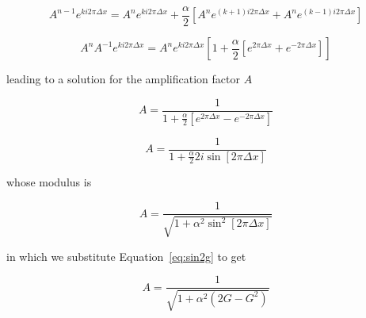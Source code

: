 \documentclass{article}
\begin{document}
\begin{homeworkProblem}
    \begin{equation}
        A^{n-1} e^{ki2\pi \Delta x} = 
        A^{n} e^{ki2\pi \Delta x} +
        \frac{\alpha}{2}[A^{n} e^{(k+1)i2\pi \Delta x} +
        A^{n} e^{(k-1)i2\pi \Delta x}]
    \end{equation}

    \begin{equation}
        A^{n} A^{-1} e^{ki2\pi \Delta x} = 
        A^{n} e^{ki2\pi \Delta x} 
        [1 + \frac{\alpha}{2}[e^{2\pi \Delta x} + e^{-2\pi \Delta x}]]
    \end{equation}

    \noindent leading to a solution for the amplification factor $A$

    \begin{equation}
        A = \frac{1}{1+\frac{\alpha}{2}[e^{2\pi \Delta x} - e^{-2\pi \Delta x}]}
    \end{equation}

    \begin{equation}
        A = \frac{1}{1+\frac{\alpha}{2}2i \sin[2\pi \Delta x]}
    \end{equation}

    \noindent whose modulus is

    \begin{equation}
        A = \frac{1}{\sqrt{1+\alpha^2 \sin^2[2\pi \Delta x]}}
    \end{equation}
    
    \noindent in which we substitute Equation~\ref{eq:sin2g} to get

    \begin{equation}
        A = \frac{1}{\sqrt{1+\alpha^2(2G-G^2)}}
    \end{equation}



\end{homeworkProblem}
\end{document}
